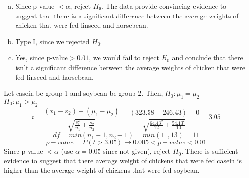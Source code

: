 {\begin{enumerate}[(a)]
\item Since p-value $< \alpha$, reject $H_0$. The data provide convincing evidence to suggest that there is a significant difference between the average weights of chicken that were fed linseed and horsebean.

\item Type I, since we rejected $H_0$.

\item Yes, since p-value$> 0.01$, we would fail to reject $H_0$ and conclude that there isn't a significant difference between the average weights of chicken that were fed linseed and horsebean.

\end{enumerate}
}\label{chickwts}

%

{
Let casein be group 1 and soybean be group 2. Then,
$H_0: \mu_1 = \mu_2$ \\
$H_0: \mu_1 > \mu_2$ \\
\[ t = \frac{(\bar{x}_1 - \bar{x_2}) - (\mu_1 - \mu_2)}{\sqrt{ \frac{s_1^2}{n_1} + \frac{s_2}{n_2} }} = \frac{(323.58 - 246.43) - 0}{ \sqrt{\frac{64.43^2}{12} + \frac{54.13^2}{10}} } = 3.05 \]
\[ df = min(n_1 - 1,  n_2 - 1) = min(11,13) = 11 \]
\[ p-value = P(t > 3.05) \rightarrow 0.005 < p-value < 0.01  \]
Since p-value $< \alpha$ (use $\alpha = 0.05$ since not given), reject $H_0$. There is sufficient evidence to suggest that there average weight of chickens that were fed casein is higher than the average weight of chickens that were fed soybean.
}

%

